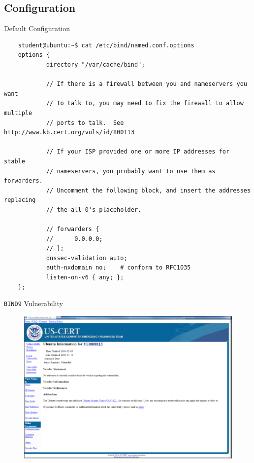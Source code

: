 \documentclass{beamer}
\begin{document}
\subsection{Configuration}
\begin{frame}[fragile]{Default Configuration}
  \begin{lstlisting}
    student@ubuntu:~$ cat /etc/bind/named.conf.options
    options {
            directory "/var/cache/bind";
    
            // If there is a firewall between you and nameservers you want
            // to talk to, you may need to fix the firewall to allow multiple
            // ports to talk.  See http://www.kb.cert.org/vuls/id/800113
    
            // If your ISP provided one or more IP addresses for stable
            // nameservers, you probably want to use them as forwarders.
            // Uncomment the following block, and insert the addresses replacing
            // the all-0's placeholder.
    
            // forwarders {
            //      0.0.0.0;
            // };
            dnssec-validation auto;
            auth-nxdomain no;    # conform to RFC1035
            listen-on-v6 { any; };
    };
  \end{lstlisting}
\end{frame}

\begin{frame}{\texttt{BIND9} Vulnerability}
  \begin{figure}
    \begin{center}
      \includegraphics[width=0.9\linewidth]{vulnerability.png}
    \end{center}
  \end{figure}
\end{frame}
\end{document}
